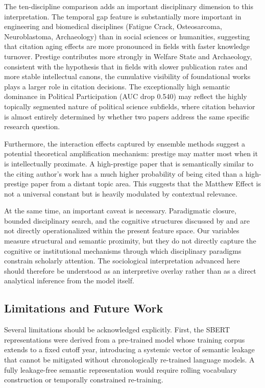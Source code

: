 \documentclass[11pt,a4paper]{article}
\begin{document}
The ten-discipline comparison adds an important disciplinary dimension to this interpretation. The temporal gap feature is substantially more important in engineering and biomedical disciplines (Fatigue Crack, Osteosarcoma, Neuroblastoma, Archaeology) than in social sciences or humanities, suggesting that citation aging effects are more pronounced in fields with faster knowledge turnover. Prestige contributes more strongly in Welfare State and Archaeology, consistent with the hypothesis that in fields with slower publication rates and more stable intellectual canons, the cumulative visibility of foundational works plays a larger role in citation decisions. The exceptionally high semantic dominance in Political Participation (AUC drop 0.540) may reflect the highly topically segmented nature of political science subfields, where citation behavior is almost entirely determined by whether two papers address the same specific research question.

Furthermore, the interaction effects captured by ensemble methods suggest a potential theoretical amplification mechanism: prestige may matter most when it is intellectually proximate. A high-prestige paper that is semantically similar to the citing author's work has a much higher probability of being cited than a high-prestige paper from a distant topic area. This suggests that the Matthew Effect is not a universal constant but is heavily modulated by contextual relevance.

At the same time, an important caveat is necessary. Paradigmatic closure, bounded disciplinary search, and the cognitive structures discussed by \citet{kuhn1962structure} and \citet{crane1972invisible} are not directly operationalized within the present feature space. Our variables measure structural and semantic proximity, but they do not directly capture the cognitive or institutional mechanisms through which disciplinary paradigms constrain scholarly attention. The sociological interpretation advanced here should therefore be understood as an interpretive overlay rather than as a direct analytical inference from the model itself.

\subsection{Limitations and Future Work}

Several limitations should be acknowledged explicitly. First, the SBERT representations were derived from a pre-trained model whose training corpus extends to a fixed cutoff year, introducing a systemic vector of semantic leakage that cannot be mitigated without chronologically re-trained language models. A fully leakage-free semantic representation would require rolling vocabulary construction or temporally constrained re-training.
\end{document}
